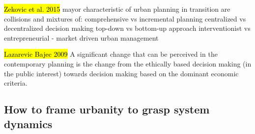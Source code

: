 \documentclass[11pt]{report}
\begin{document}
\hl{Zekovic et al. 2015}
mayor characteristic of urban planning in transition are collisions and mixtures of:
    comprehensive vs incremental planning
    centralized vs decentralized decision making
    top-down vs bottom-up approach
    interventionist vs entrepreneurial - market driven urban management
    
\hl{Lazarevic Bajec 2009}
A significant change that can be perceived in the contemporary planning is the change from the ethically based decision making (in the public interest) towards decision making based on the dominant economic criteria.

\subsection{How to frame urbanity to grasp system dynamics}
\end{document}
